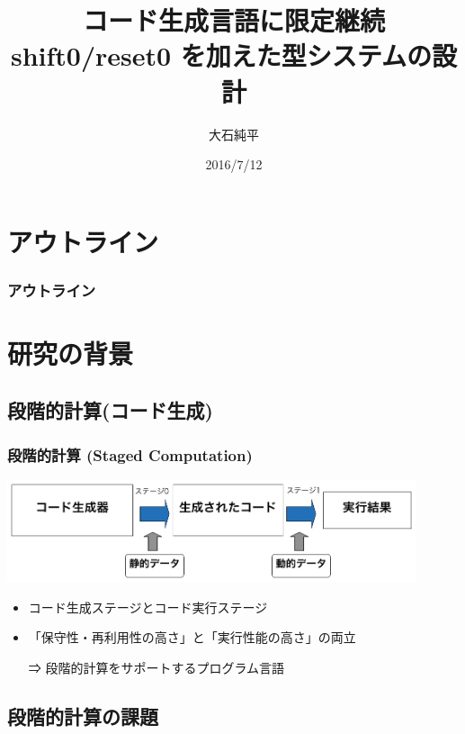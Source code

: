 \documentclass[dvipdfmx,cjk,xcolor=dvipsnames,envcountsect,notheorems,12pt]{beamer}
\title{コード生成言語に限定継続 shift0/reset0 を加えた型システムの設計}
\author{大石純平}
\institute[筑波大学 プログラム論理研究室]{筑波大学 大学院 \\ プログラム論理研究室}%
\date{2016/7/12}
\theoremstyle{definition}
\begin{document}
\frame[plain]{\titlepage}%

\section*{アウトライン}

\begin{frame}
  \frametitle{アウトライン}
  \tableofcontents[sectionstyle=show,subsectionstyle=hide]
\end{frame}

\section{研究の背景}
\subsection{段階的計算(コード生成)}
\begin{frame}
  \frametitle{段階的計算 (Staged Computation)}
  \includegraphics[clip,width=12cm]{./img/prggen.png}

  \begin{itemize}
  \item コード生成ステージとコード実行ステージ
  \item 「保守性・再利用性の高さ」と「実行性能の高さ」の両立
  \item[⇒] 段階的計算をサポートするプログラム言語
  \end{itemize}
\end{frame}

\subsection{段階的計算の課題}
\end{document}
